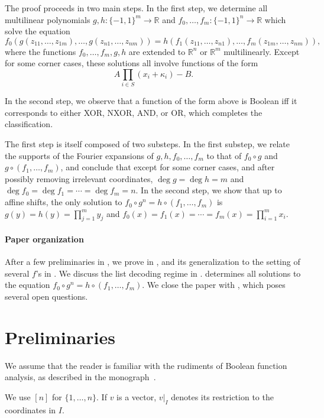 \documentclass{article}
\theoremstyle{definition}
\theoremstyle{remark}
\begin{document}
The proof proceeds in two main steps. In the first step, we determine all multilinear polynomials $g,h\colon \{-1,1\}^m \to \mathbb{R}$ and $f_0,\ldots,f_m\colon \{-1,1\}^n \to \mathbb{R}$ which solve the equation
\[
 f_0(g(z_{11},\ldots,z_{1m}),\ldots,g(z_{n1},\ldots,z_{nm})) =
 h(f_1(z_{11},\ldots,z_{n1}),\ldots,f_m(z_{1m},\ldots,z_{nm})),
\]
where the functions $f_0,\ldots,f_m,g,h$ are extended to $\mathbb{R}^n$ or $\mathbb{R}^m$ multilinearly.
Except for some corner cases, these solutions all involve functions of the form
\[
 A \prod_{i \in S} (x_i + \kappa_i) - B.
\]

In the second step, we observe that a function of the form above is Boolean iff it corresponds to either XOR, NXOR, AND, or OR, which completes the classification.

The first step is itself composed of two substeps. In the first substep, we relate the supports of the Fourier expansions of $g,h,f_0,\ldots,f_m$ to that of $f_0 \circ g$ and $g \circ (f_1,\ldots,f_m)$, and conclude that except for some corner cases, and after possibly removing irrelevant coordinates, $\deg g = \deg h = m$ and $\deg f_0 = \deg f_1 = \cdots = \deg f_m = n$. In the second step, we show that up to affine shifts, the only solution to $f_0 \circ g^n = h \circ (f_1,\ldots,f_m)$ is $g(y) = h(y) = \prod_{j=1}^m y_j$ and $f_0(x) = f_1(x) = \cdots = f_m(x) = \prod_{i=1}^m x_i$.

\paragraph{Paper organization} After a few preliminaries in , we prove  in , and its generalization to the setting of several $f$'s in . We discuss the list decoding regime in .  determines all solutions to the equation $f_0 \circ g^n = h \circ (f_1,\ldots,f_m)$. We close the paper with , which poses several open questions.

\section{Preliminaries}
\label{sec:prel}

We assume that the reader is familiar with the rudiments of Boolean function analysis, as described in the monograph~\cite{ODonnell}.

We use $[n]$ for $\{1,\ldots,n\}$. If $v$ is a vector, $v|_I$ denotes its restriction to the coordinates in $I$.
\end{document}
